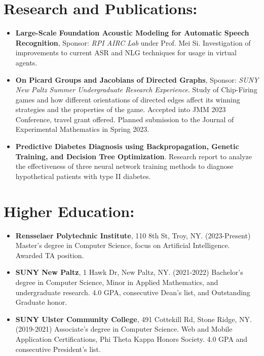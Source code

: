 \section*{Research and Publications:}
\begin{itemize}
    \itemsep0em
    \item \textbf{Large-Scale Foundation Acoustic Modeling for Automatic Speech Recognition}, 
        Sponsor: \textit{RPI AIRC Lab} under Prof. Mei Si. 
        Investigation of improvements to current ASR and NLG techniques for usage in virtual agents.

    \item \textbf{On Picard Groups and Jacobians of Directed Graphs}, 
        Sponsor: \textit{SUNY New Paltz Summer Undergraduate Research Experience}. 
        Study of Chip-Firing games and how different orientations of directed edges affect its 
        winning strategies and the properties of the game.  Accepted into JMM 2023 Conference, travel 
        grant offered.  Planned submission to the Journal of Experimental Mathematics in Spring 2023.
    \item \textbf{Predictive Diabetes Diagnosis using Backpropagation, Genetic Training, and Decision 
        Tree Optimization}. Research report to analyze the effectiveness of three neural network 
        training methods to diagnose hypothetical patients with type II diabetes.
\end{itemize}

\section*{Higher Education:}
\begin{itemize}
    \itemsep0em
    \item \textbf{Rensselaer Polytechnic Institute}, 110 8th St, Troy, NY. (2023-Present) 
    Master's degree in Computer Science, focus on Artificial Intelligence.  Awarded TA position.
    \item \textbf{SUNY New Paltz}, 1 Hawk Dr, New Paltz, NY. (2021-2022) Bachelor's degree in 
        Computer Science, Minor in Applied Mathematics, and undergraduate research. 4.0 GPA, 
        consecutive Dean's list, and Outstanding Graduate honor.
    \item \textbf{SUNY Ulster Community College}, 491 Cottekill Rd, Stone Ridge, NY. (2019-2021) 
        Associate's degree in Computer Science. Web and Mobile Application Certifications, 
        Phi Theta Kappa Honors Society. 4.0 GPA and consecutive President's list.
\end{itemize}

